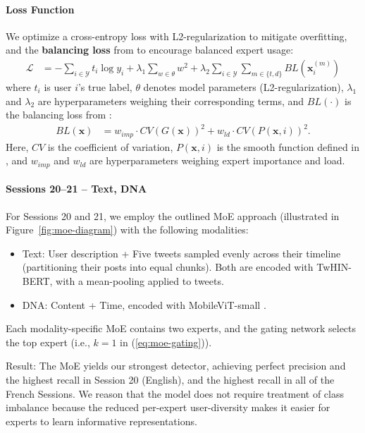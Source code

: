 \documentclass[conference]{IEEEtran}
\begin{document}
\paragraph{Loss Function}
We optimize a cross-entropy loss 
with L2-regularization to mitigate overfitting,
and the \textbf{balancing loss} from \citet{shazeer2017outrageously}
to encourage balanced expert usage:
\begin{align}
\mathcal{L} &= -\sum_{i \in \mathcal{Y}} t_i \log y_i + \lambda_1 \sum_{w \in \theta} w^2 + \lambda_2 \sum_{i \in \mathcal{Y}} \sum_{m \in \{t, d\}}^{} BL(\mathbf{x}_i^{(m)})
\end{align}
where $t_i$ is user $i$'s true label,
\(\theta \) denotes model parameters (L2-regularization),
$\lambda_1$ and $\lambda_2$ are hyperparameters weighing their corresponding terms,
and \( BL(\cdot) \) is the balancing loss from \citet{shazeer2017outrageously}:
\begin{align}
BL(\mathbf{x}) &= w_{imp} \cdot CV(G(\mathbf{x}))^2 + w_{ld} \cdot CV(P(\mathbf{x}, i))^2.
\end{align}
Here, \( CV \) is the coefficient of variation, \(P(\mathbf{x}, i) \) is the smooth function defined in 
\citet{shazeer2017outrageously}, and \(w_{imp} \) and \(w_{ld} \) are 
hyperparameters weighing expert importance and load. 

\paragraph{\textbf{Sessions 20–21} – Text, DNA}
For Sessions 20 and 21, we employ the outlined 
MoE approach (illustrated in Figure~\ref{fig:moe-diagram}) 
with the following modalities:
\begin{itemize}
    \item Text: User description + 
    Five tweets sampled evenly across their timeline 
    (partitioning their posts into equal chunks).
    Both are encoded with TwHIN-BERT, with a mean-pooling applied to tweets.
    \item DNA: Content + Time, encoded with MobileViT-small \citep{mehta2021mobilevit}.
\end{itemize}
Each modality-specific MoE contains two experts, and
the gating network selects the top expert (i.e., $k=1$ in (\ref{eq:moe-gating})).

Result: The MoE yields our strongest detector, 
achieving perfect precision and the highest recall in Session 20 (English), 
and the highest recall in all of the French Sessions.
We reason that the model does not require treatment 
of class imbalance because the reduced per-expert user-diversity
makes it easier for experts to learn informative representations.
\end{document}
